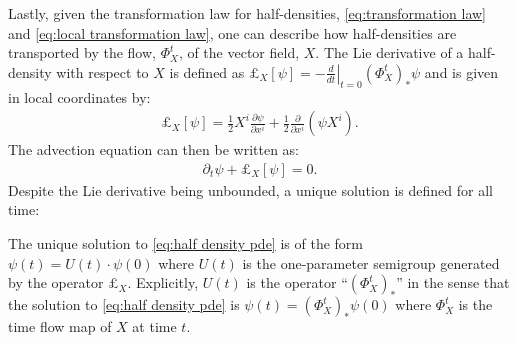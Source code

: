 \documentclass[final,leqno]{siamart}
\newcommand{\pder}[2]{\ensuremath{\frac{ \partial #1}{\partial #2}}}
\begin{document}
Lastly, given the transformation law for half-densities, \eqref{eq:transformation law} and \eqref{eq:local transformation law}, one can describe how half-densities are transported by the flow, $\Phi_{X}^{t}$, of the vector field, $X$. 
The Lie derivative of a half-density with respect to $X$ is defined as $\pounds_{X}[\psi] = - \left. \frac{d}{dt} \right|_{t=0} (\Phi_{X}^{t})_{*} \psi$ and is given in local coordinates by:
\begin{align}
	\pounds_{X}[\psi] = \frac{1}{2} X^{i} \pder{\psi}{x^{i}} + \frac{1}{2} \pder{}{x^{i}} \left( \psi X^{i} \right). \label{eq:representation}
\end{align}
The advection equation can then be written as:
\begin{align}
	\partial_{t} \psi + \pounds_{X}[\psi] = 0. \label{eq:half density pde}
\end{align}
Despite the Lie derivative being unbounded, a unique solution is defined for all time:
\begin{proposition} \label{prop:stone}
	The unique solution to \eqref{eq:half density pde} is of the form $\psi(t) = U(t) \cdot \psi(0)$ where $U(t)$ is the one-parameter semigroup generated by the operator $\pounds_{X}$.
	Explicitly, $U(t)$ is the operator ``$(\Phi_{X}^{t})_{*}$'' in the sense that the solution to \eqref{eq:half density pde} is $\psi(t) = (\Phi_{X}^{t})_{*} \psi(0)$ where $\Phi_{X}^{t}$ is the time flow map of $X$ at time $t$.
\end{proposition}
\end{document}
